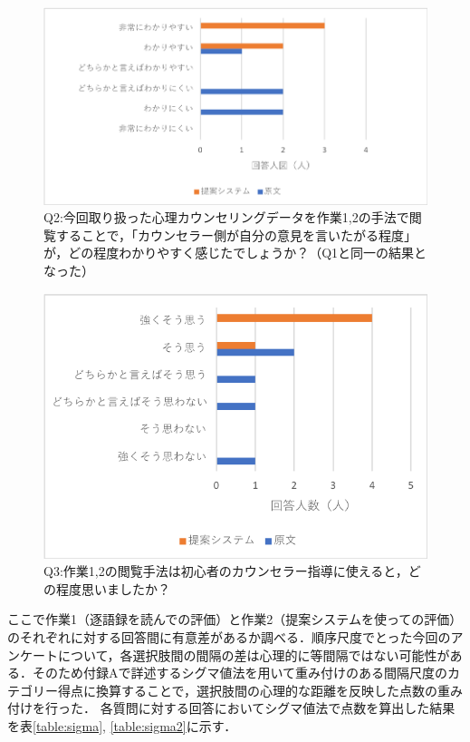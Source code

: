 \documentclass[shuuron]{kuee}
\begin{document}
\begin{figure}
  \begin{center}
    \includegraphics[width=\linewidth]{q1.png}
  \end{center}
  \caption{Q2:今回取り扱った心理カウンセリングデータを作業1,2の手法で閲覧することで，「カウンセラー側が自分の意見を言いたがる程度」が，どの程度わかりやすく感じたでしょうか？（Q1と同一の結果となった）}
  \label{fig:q2}
\end{figure}

\begin{figure}
  \begin{center}
    \includegraphics[width=\linewidth]{q3.png}
  \end{center}
  \caption{Q3:作業1,2の閲覧手法は初心者のカウンセラー指導に使えると，どの程度思いましたか？}
  \label{fig:q3}
\end{figure}

ここで作業1（逐語録を読んでの評価）と作業2（提案システムを使っての評価）のそれぞれに対する回答間に有意差があるか調べる．順序尺度でとった今回のアンケートについて，各選択肢間の間隔の差は心理的に等間隔ではない可能性がある．そのため付録Aで詳述するシグマ値法を用いて重み付けのある間隔尺度のカテゴリー得点に換算することで，選択肢間の心理的な距離を反映した点数の重み付けを行った．
各質問に対する回答においてシグマ値法で点数を算出した結果を表\ref{table:sigma}, \ref{table:sigma2}に示す．
\end{document}
